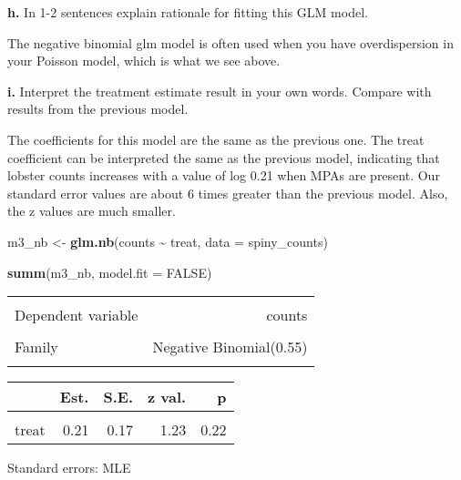 \documentclass[
]{article}
\newenvironment{Shaded}{\begin{snugshade}}{\end{snugshade}}
\newcommand{\AttributeTok}[1]{\textcolor[rgb]{0.13,0.29,0.53}{#1}}
\newcommand{\ConstantTok}[1]{\textcolor[rgb]{0.56,0.35,0.01}{#1}}
\newcommand{\FunctionTok}[1]{\textcolor[rgb]{0.13,0.29,0.53}{\textbf{#1}}}
\newcommand{\NormalTok}[1]{#1}
\newcommand{\OtherTok}[1]{\textcolor[rgb]{0.56,0.35,0.01}{#1}}
\newcommand{\SpecialCharTok}[1]{\textcolor[rgb]{0.81,0.36,0.00}{\textbf{#1}}}
\begin{document}
\textbf{h.} In 1-2 sentences explain rationale for fitting this GLM
model.

The negative binomial glm model is often used when you have
overdispersion in your Poisson model, which is what we see above.

\textbf{i.} Interpret the treatment estimate result in your own words.
Compare with results from the previous model.

The coefficients for this model are the same as the previous one. The
treat coefficient can be interpreted the same as the previous model,
indicating that lobster counts increases with a value of log 0.21 when
MPAs are present. Our standard error values are about 6 times greater
than the previous model. Also, the z values are much smaller.

\begin{Shaded}
\begin{Highlighting}[]
\NormalTok{m3\_nb }\OtherTok{\textless{}{-}} \FunctionTok{glm.nb}\NormalTok{(counts }\SpecialCharTok{\textasciitilde{}}\NormalTok{ treat, }\AttributeTok{data =}\NormalTok{ spiny\_counts)}

\FunctionTok{summ}\NormalTok{(m3\_nb, }\AttributeTok{model.fit =} \ConstantTok{FALSE}\NormalTok{)}
\end{Highlighting}
\end{Shaded}

\begin{table}[!h]
\centering
\begin{tabular}{lr}
\toprule
\cellcolor{gray!10}{Observations} & \cellcolor{gray!10}{252}\\
Dependent variable & counts\\
\cellcolor{gray!10}{Type} & \cellcolor{gray!10}{Generalized linear model}\\
Family & Negative Binomial(0.55)\\
\cellcolor{gray!10}{Link} & \cellcolor{gray!10}{log}\\
\bottomrule
\end{tabular}
\end{table}  \begin{table}[!h]
\centering
\begin{threeparttable}
\begin{tabular}{lrrrr}
\toprule
  & Est. & S.E. & z val. & p\\
\midrule
\cellcolor{gray!10}{(Intercept)} & \cellcolor{gray!10}{3.12} & \cellcolor{gray!10}{0.12} & \cellcolor{gray!10}{26.40} & \cellcolor{gray!10}{0.00}\\
treat & 0.21 & 0.17 & 1.23 & 0.22\\
\bottomrule
\end{tabular}
\begin{tablenotes}
\item Standard errors: MLE
\end{tablenotes}
\end{threeparttable}
\end{table}
\end{document}
